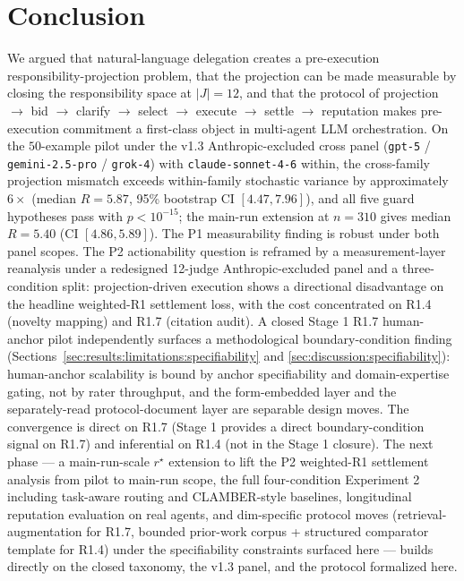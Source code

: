 \section{Conclusion}
\label{sec:conclusion}

We argued that natural-language delegation creates a pre-execution responsibility-projection problem, that the projection can be made measurable by closing the responsibility space at $|J| = 12$, and that the protocol of projection $\to$ bid $\to$ clarify $\to$ select $\to$ execute $\to$ settle $\to$ reputation makes pre-execution commitment a first-class object in multi-agent LLM orchestration. On the $50$-example pilot under the v1.3 Anthropic-excluded cross panel (\texttt{gpt-5} / \texttt{gemini-2.5-pro} / \texttt{grok-4}) with \texttt{claude-sonnet-4-6} within, the cross-family projection mismatch exceeds within-family stochastic variance by approximately $6\times$ (median $R = 5.87$, 95\% bootstrap CI $[4.47, 7.96]$), and all five guard hypotheses pass with $p < 10^{-15}$; the main-run extension at $n = 310$ gives median $R = 5.40$ (CI $[4.86, 5.89]$). The P1 measurability finding is robust under both panel scopes. The P2 actionability question is reframed by a measurement-layer reanalysis under a redesigned 12-judge Anthropic-excluded panel and a three-condition split: projection-driven execution shows a directional disadvantage on the headline weighted-R1 settlement loss, with the cost concentrated on R1.4 (novelty mapping) and R1.7 (citation audit). A closed Stage 1 R1.7 human-anchor pilot independently surfaces a methodological boundary-condition finding (Sections~\ref{sec:results:limitations:specifiability} and \ref{sec:discussion:specifiability}): human-anchor scalability is bound by anchor specifiability and domain-expertise gating, not by rater throughput, and the form-embedded layer and the separately-read protocol-document layer are separable design moves. The convergence is direct on R1.7 (Stage 1 provides a direct boundary-condition signal on R1.7) and inferential on R1.4 (not in the Stage 1 closure). The next phase --- a main-run-scale $r^\star$ extension to lift the P2 weighted-R1 settlement analysis from pilot to main-run scope, the full four-condition Experiment 2 including task-aware routing and CLAMBER-style baselines, longitudinal reputation evaluation on real agents, and dim-specific protocol moves (retrieval-augmentation for R1.7, bounded prior-work corpus + structured comparator template for R1.4) under the specifiability constraints surfaced here --- builds directly on the closed taxonomy, the v1.3 panel, and the protocol formalized here.
